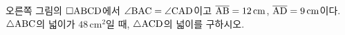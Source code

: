 \noindent\begin{minipage}[t]{0.58\linewidth}\vspace{0pt}\raggedright 오른쪽 그림의 $\square\mathrm{ABCD}$에서 $\angle\mathrm{BAC}=\angle\mathrm{CAD}$이고 $\overline{\mathrm{AB}}=12\,\mathrm{cm}$, $\overline{\mathrm{AD}}=9\,\mathrm{cm}$이다. $\triangle\mathrm{ABC}$의 넓이가 $48\,\mathrm{cm}^2$일 때, $\triangle\mathrm{ACD}$의 넓이를 구하시오. \end{minipage}\hfill\begin{minipage}[t]{0.4\linewidth}\vspace{0pt}\centering \resizebox{\ifdim\width>\linewidth\linewidth\else\width\fi}{!}{}\end{minipage}\par
